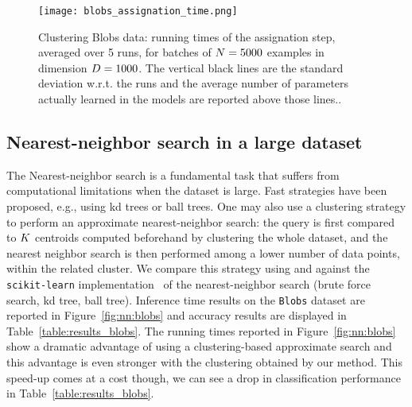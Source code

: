 \begin{figure}[tbh]
\centering
\texttt{[image: blobs\_assignation\_time.png]}
\caption{Clustering Blobs data: running times of the assignation step, averaged over 5 runs, for batches of $N=5000$ examples in dimension $D=1000$. The vertical black lines are the standard deviation w.r.t. the runs and the average number of parameters actually learned  in the models are reported above those lines..}
\label{fig:clustering:blobs:assignation_time}
\end{figure}

\subsection{Nearest-neighbor search in a large dataset}
The Nearest-neighbor search is a fundamental task that suffers from computational limitations when the dataset is large.
Fast strategies have been proposed, e.g., using kd trees or ball trees.
One may also use a clustering strategy to perform an approximate nearest-neighbor search: the query is first compared to $K$ centroids computed beforehand by clustering the whole dataset, and the nearest neighbor search is then performed among a lower number of data points, within the related cluster.
We compare this strategy using \kmeans and \qkmeans against the \texttt{scikit-learn} implementation~\cite{Pedregosa2011Scikit} of the nearest-neighbor search (brute force search, kd tree, ball tree).
Inference time results on the \texttt{Blobs} dataset are reported in Figure~\ref{fig:nn:blobs} and accuracy results are displayed in Table~\ref{table:results_blobs}. 
The running times reported in Figure~\ref{fig:nn:blobs} show a dramatic advantage of using a clustering-based approximate search  and this advantage is even stronger with the clustering obtained by our \qkmeans method. This speed-up comes at a cost though, we can see a drop in classification performance in Table~\ref{table:results_blobs}. 

